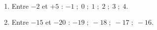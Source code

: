    \ \\ [-5mm]
   \begin{enumerate}
      \item Entre $-2$ et $+5$ : {\blue$-1 \; ; \; 0 \; ; \; 1 \; ; \; 2 \; ; \; 3 \; ; \; 4$}. \smallskip
      \item Entre $-15$ et $-20$ : {\blue $-19 \; ; \; -18 \; ; \; -17 \; ; \; -16$}. \smallskip
   \end{enumerate}
